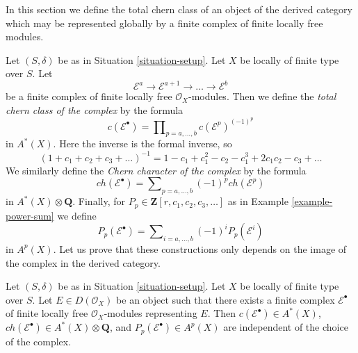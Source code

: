 \noindent
In this section we define the total chern class of an object
of the derived category which may be represented globally
by a finite complex of finite locally free modules.

\medskip\noindent
Let $(S, \delta)$ be as in Situation \ref{situation-setup}.
Let $X$ be locally of finite type over $S$. Let
$$
\mathcal{E}^a \to \mathcal{E}^{a + 1} \to \ldots \to \mathcal{E}^b
$$
be a finite complex of finite locally free $\mathcal{O}_X$-modules.
Then we define the {\it total chern class of the complex} by the formula
$$
c(\mathcal{E}^\bullet) = \prod\nolimits_{p = a, \ldots, b}
c(\mathcal{E}^p)^{(-1)^p}
$$
in $A^*(X)$. Here the inverse is the formal inverse, so
$$
(1 + c_1 + c_2 + c_3 + \ldots)^{-1} =
1 - c_1 + c_1^2 - c_2 - c_1^3 + 2c_1 c_2 - c_3 + \ldots
$$
We similarly define the {\it Chern character of the complex} by
the formula
$$
ch(\mathcal{E}^\bullet) = \sum\nolimits_{p = a, \ldots, b}
(-1)^p ch(\mathcal{E}^p)
$$
in $A^*(X) \otimes \mathbf{Q}$. Finally, for
$P_p \in \mathbf{Z}[r, c_1, c_2, c_3, \ldots]$
as in Example \ref{example-power-sum} we define
$$
P_p(\mathcal{E}^\bullet) = \sum\nolimits_{i = a, \ldots, b}
(-1)^i P_p(\mathcal{E}^i)
$$
in $A^p(X)$. Let us prove that these constructions only depends
on the image of the complex in the derived category.

\begin{lemma}
\label{lemma-pre-derived-chern-class}
Let $(S, \delta)$ be as in Situation \ref{situation-setup}.
Let $X$ be locally of finite type over $S$. Let $E \in D(\mathcal{O}_X)$
be an object such that there exists a finite complex $\mathcal{E}^\bullet$
of finite locally free $\mathcal{O}_X$-modules representing $E$.
Then $c(\mathcal{E}^\bullet) \in A^*(X)$,
$ch(\mathcal{E}^\bullet) \in A^*(X) \otimes \mathbf{Q}$, and
$P_p(\mathcal{E}^\bullet) \in A^p(X)$
are independent of the choice of the complex.
\end{lemma}

